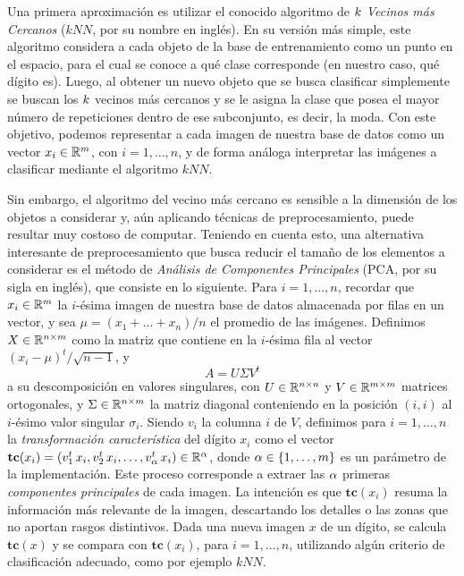 Una primera aproximaci\'on es utilizar el conocido algoritmo de \emph{$k$ Vecinos m\'as Cercanos} ($kNN$, por su nombre en ingl\'es). En su versi\'on m\'as simple, este algoritmo considera a cada objeto de la base de entrenamiento como un punto en el espacio, para el cual se conoce a qu\'e clase corresponde (en nuestro caso, qu\'e d\'igito es). Luego, al obtener un nuevo objeto que se busca clasificar simplemente se buscan los $k$ vecinos m\'as cercanos y se le asigna la clase que posea el mayor n\'umero de repeticiones dentro de ese subconjunto, es decir, la moda. Con este objetivo, podemos representar a cada imagen de nuestra base de datos como un vector $x_i \in \mathbb{R}^{m}$, con $i = 1,\dots,n$, y de forma an\'aloga interpretar las im\'agenes a clasificar mediante el algoritmo $kNN$.

Sin embargo, el algoritmo del vecino m\'as cercano es sensible a la dimensi\'on de los objetos a considerar y, a\'un aplicando t\'ecnicas de preprocesamiento, puede resultar muy costoso de computar. Teniendo en cuenta esto, una alternativa interesante de preprocesamiento que busca reducir el tama\~no de los elementos a considerar es el m\'etodo de \emph{An\'alisis de Componentes Principales} (PCA, por su sigla en ingl\'es), que consiste en lo siguiente. Para $i = 1,\ldots, n$, recordar que $x_i \in \mathbb{R}^{m}$ la $i$-\'esima imagen de nuestra base de datos almacenada por filas en un vector, y sea $\mu = (x_1 + \ldots + x_n)/n$ el promedio de las im\'agenes. Definimos $X\in\mathbb{R}^{n\times m}$ como la matriz que contiene en la $i$-\'esima fila al vector $(x_i - \mu)^{t}/\sqrt{n-1}$, y $$A=U \Sigma V^t$$ a su descomposici\'on en valores singulares, con $U\in\mathbb{R}^{n\times n}$ y $V\in\mathbb{R}^{m\times m}$ matrices ortogonales, y $\Sigma\in\mathbb{R}^{n\times m}$ la matriz diagonal conteniendo en la posici\'on $(i,i)$ al $i$-\'esimo valor singular $\sigma_i$. Siendo $v_i$ la columna $i$ de $V$, definimos para $i = 1,\ldots,n$ la \textsl{transformaci\'on caracter\'istica} del d\'igito $x_{i}$ como el vector $\mathbf{tc}(x_i) = (v_1^t\, x_i, v_2^t\, x_i,\ldots,v_{\alpha}^t\, x_i) \in\mathbb{R}^{\alpha}$, donde $\alpha \in\{1,\ldots,m\}$ es un par\'ametro de la implementaci\'on. Este proceso corresponde a extraer las $\alpha$ primeras \textit{componentes principales} de cada imagen. La intenci\'on es que $\mathbf{tc}(x_i)$ resuma la informaci\'on m\'as relevante de la imagen, descartando los detalles o las zonas que no aportan rasgos distintivos. Dada una nueva imagen $x$ de un d\'igito, se calcula $\mathbf{tc}(x)$ y se compara con $\mathbf{tc}(x_i)$, para $i = 1,\ldots, n$, utilizando alg\'un criterio de clasificaci\'on adecuado, como por ejemplo $kNN$.

